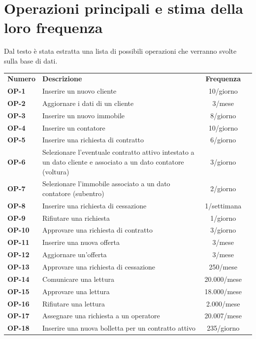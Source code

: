 \documentclass[a4paper,12pt]{report}
\begin{document}
\section{Operazioni principali e stima della loro frequenza}
Dal testo è stata estratta una lista di possibili operazioni che verranno svolte sulla base di dati.
\\[2pt]
\begin{longtable}{l p{10cm} c r}
    \hline
    \textbf{Numero} & \textbf{Descrizione} & \textbf{Frequenza}\\ [0.5ex]
    \textbf{OP-1} & Inserire un nuovo cliente & 10/giorno \\
    \textbf{OP-2} & Aggiornare i dati di un cliente & 3/mese \\
    \textbf{OP-3} & Inserire un nuovo immobile & 8/giorno \\
    \textbf{OP-4} & Inserire un contatore & 10/giorno \\
    \textbf{OP-5} & Inserire una richiesta di contratto & 6/giorno \\
    \textbf{OP-6} & Selezionare l'eventuale contratto attivo intestato a un dato cliente e associato a un dato contatore (voltura) & 3/giorno \\
    \textbf{OP-7} & Selezionare l'immobile associato a un dato contatore (subentro) & 2/giorno \\
    \textbf{OP-8} & Inserire una richiesta di cessazione & 1/settimana \\
    \textbf{OP-9} & Rifiutare una richiesta & 1/giorno \\
    \textbf{OP-10} & Approvare una richiesta di contratto & 3/giorno \\
    \textbf{OP-11} & Inserire una nuova offerta & 3/mese \\
    \textbf{OP-12} & Aggiornare un'offerta & 3/mese \\
    \textbf{OP-13} & Approvare una richiesta di cessazione & 250/mese \\
    \textbf{OP-14} & Comunicare una lettura & 20.000/mese \\
    \textbf{OP-15} & Approvare una lettura & 18.000/mese \\
    \textbf{OP-16} & Rifiutare una lettura & 2.000/mese \\
    \textbf{OP-17} & Assegnare una richiesta a un operatore & 20.007/mese \\
    \textbf{OP-18} & Inserire una nuova bolletta per un contratto attivo & 235/giorno \\

\end{longtable}
\end{document}
